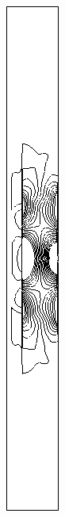 \begin{figure}[h]
\begin{subfigure}[b]{0.13\textwidth}
\caption{ }
\end{subfigure}
\begin{subfigure}[b]{0.13\textwidth}
\centering
\includegraphics[width=\textwidth]{png/cranium/2d-syy-single-comp-02.png}

\end{subfigure}
\end{figure}
